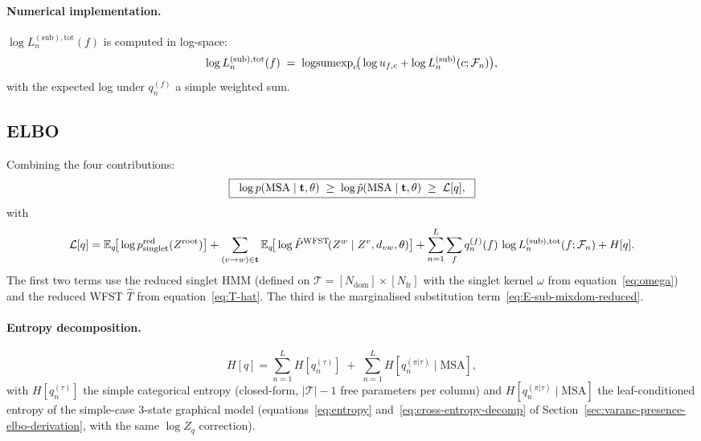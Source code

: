 \paragraph{Numerical implementation.}
$\log L^{(\text{sub}), \text{tot}}_n(f)$ is computed in log-space:
\begin{equation}
\log L^{(\text{sub}), \text{tot}}_n(f)
\;=\; \mathrm{logsumexp}_c\!\big(\log u_{f, c}
                                   + \log L^{(\text{sub})}_n(c; \mathcal{F}_n)\big),
\end{equation}
with the expected log under $q_n^{(f)}$ a simple weighted sum.

\subsection{ELBO}
\label{sec:varanc-mixdom-elbo}

Combining the four contributions:
\begin{equation}
\label{eq:elbo-mixdom-reduced}
\boxed{\;\;
\log p(\text{MSA} \mid \mathbf{t}, \theta)
\;\geq\;
\log \tilde{p}(\text{MSA} \mid \mathbf{t}, \theta)
\;\geq\;
\mathcal{L}[q],
\;\;}
\end{equation}
with
\begin{equation}
\label{eq:elbo-mixdom-reduced-detail}
\mathcal{L}[q]
= \mathbb{E}_q\!\big[\log p_{\text{singlet}}^{\text{red}}(Z^{\text{root}})\big]
+ \sum_{(v\to w) \in \mathbf{t}}
   \mathbb{E}_q\!\big[\log \hat{P}^{\text{WFST}}\!(Z^w \mid Z^v, d_{vw}, \theta)\big]
+ \sum_{n=1}^L \sum_f q_n^{(f)}(f)\,\log L^{(\text{sub}), \text{tot}}_n(f; \mathcal{F}_n)
+ H[q].
\end{equation}
The first two terms use the reduced singlet HMM (defined on
$\mathcal{T} = [N_{\text{dom}}] \times [N_{\text{fr}}]$ with the
singlet kernel $\omega$ from equation~\eqref{eq:omega}) and the
reduced WFST $\hat{T}$ from
equation~\eqref{eq:T-hat}. The third is the marginalised substitution
term~\eqref{eq:E-sub-mixdom-reduced}.

\paragraph{Entropy decomposition.}
\begin{equation}
\label{eq:entropy-mixdom-reduced}
H[q]
= \sum_{n=1}^L H[q_n^{(\tau)}] \;+\; \sum_{n=1}^L H[q_n^{(\pi|\tau)} \mid \text{MSA}],
\end{equation}
with $H[q_n^{(\tau)}]$ the simple categorical entropy
(closed-form, $|\mathcal{T}| - 1$ free parameters per column) and
$H[q_n^{(\pi|\tau)} \mid \text{MSA}]$ the leaf-conditioned entropy of
the simple-case 3-state graphical model
(equations~\eqref{eq:entropy} and~\eqref{eq:cross-entropy-decomp} of
Section~\ref{sec:varanc-presence-elbo-derivation}, with the same
$\log Z_q$ correction).

